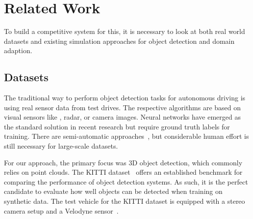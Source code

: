 \section{Related Work}
To build a competitive system for this, it is necessary to look at both real world datasets and existing simulation approaches for object detection and domain adaption.
\subsection{Datasets}
The traditional way to perform object detection tasks for autonomous driving is using real sensor data from test drives. The respective algorithms are based on visual sensors like \li, radar, or camera images. Neural networks have emerged as the standard solution in recent research but require ground truth labels for training. 
There are semi-automatic approaches~\cite{autonomousvision_kitti-360_2024}, but considerable human effort is still necessary for large-scale datasets.  

For our approach, the primary focus was 3D object detection, which commonly relies on \li point clouds. 
The KITTI dataset~\cite{geiger_are_2012} offers an established benchmark for comparing the performance of object detection systems.
As such, it is the perfect candidate to evaluate how well objects can be detected when training on synthetic data.
The test vehicle for the KITTI dataset is equipped with a stereo camera setup and a Velodyne \li sensor~\cite{velodyne_velodyne_2009}. %

